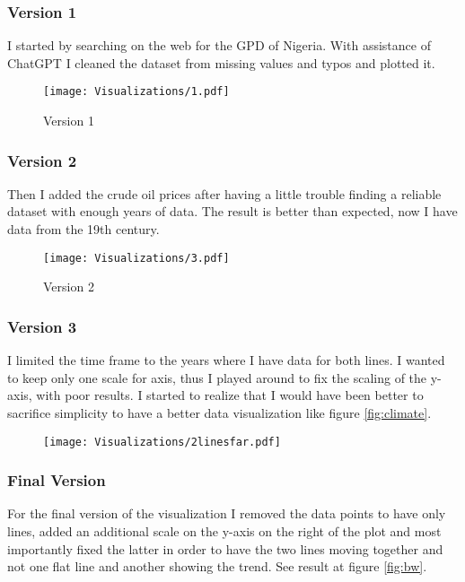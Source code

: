 \documentclass[a4paper,landscape]{article}
\begin{document}
\newpage

\subsubsection{Version 1}
I started by searching on the web for the GPD of Nigeria. With assistance of ChatGPT I cleaned the dataset from missing values and typos and plotted it.
\begin{figure}[H]
    \centering
    \texttt{[image: Visualizations/1.pdf]} %
    \caption{Version 1}
    \label{fig:1}
\end{figure}

\newpage
\subsubsection{Version 2}

Then I added the crude oil prices after having a little trouble finding a reliable dataset with enough years of data. The result is better than expected, now I have data from the 19th century.
\begin{figure}[H]
    \centering
    \texttt{[image: Visualizations/3.pdf]} %
    \caption{Version 2}
    \label{fig:2}
\end{figure}

\subsubsection{Version 3}
 I limited the time frame to the years where I have data for both lines. I wanted to keep only one scale for axis, thus I played around to fix the scaling of the y-axis, with poor results. I started to realize that I would have been better to sacrifice simplicity to have a better data visualization like figure \ref{fig:climate}.
\begin{figure}[H]
    \centering
    \texttt{[image: Visualizations/2linesfar.pdf]} %
    \caption{}
    \label{fig:3}
\end{figure}

\subsubsection{Final Version}
For the final version of the visualization I removed the data points to have only lines, added an additional scale on the y-axis on the right of the plot and most importantly fixed the latter in order to have the two lines moving together and not one flat line and another showing the trend. See result at figure \ref{fig:bw}.
\end{document}
